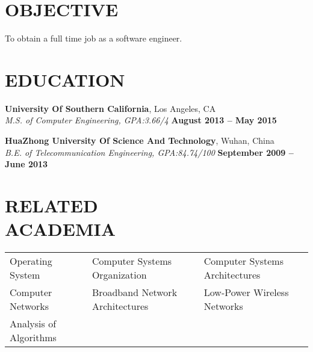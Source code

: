 \documentclass[margin,line]{resume}
\begin{document}
\begin{resume}

\vspace{1mm}
	\section{\mysidestyle \textbf{\large{O}\small{BJECTIVE}}}
	To obtain a full time job as a software engineer.

	\sectionline

    \section{\mysidestyle \textbf{\large{E}\small{DUCATION}}}
    \textbf{\listing University Of Southern California}, Los Angeles, CA \vspace{2mm}\\\vspace{1mm}%
    \textsl{M.S. of Computer Engineering, GPA:3.66/4} \hfill \textbf{August 2013 -- May 2015}\vspace{-3mm}\\\vspace{-1mm}%

    \textbf{\listing HuaZhong University Of Science And Technology}, Wuhan, China \vspace{2mm}\\\vspace{1mm}%
    \textsl{B.E. of Telecommunication Engineering, GPA:84.74/100} \hfill \textbf{September 2009 -- June 2013}\vspace{-3mm}\\\vspace{-1mm}%


\sectionline

    \section{\mysidestyle \textbf{\large{R}\small{ELATED\\ACADEMIA}}} 

	\vspace{1mm} %
	\begin{tabular}{@{}p{4cm}p{5.5cm}p{5.5cm}}
	Operating System     &  Computer Systems Organization        &  Computer Systems Architectures\\
	Computer Networks    &  Broadband Network Architectures      &  Low-Power Wireless Networks\\
	Analysis of Algorithms %
	\vspace{3mm}
	\end{tabular}



\end{resume}
\end{document}
